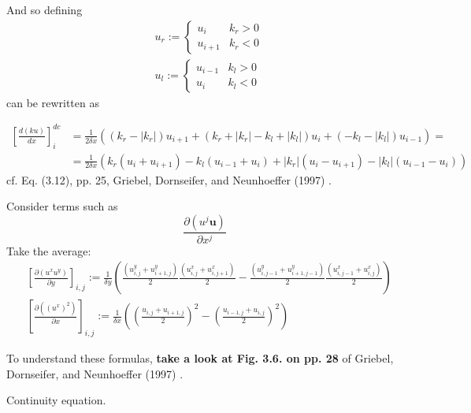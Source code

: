\documentclass[10pt]{amsart}
\begin{document}
\begin{multicols*}{2}
And so defining
\begin{equation}
  \begin{aligned}
    & u_r := \begin{cases} u_i & k_r > 0 \\ u_{i+1} & k_r < 0 \end{cases} \\
    & u_l := \begin{cases} u_{i-1} & k_l > 0 \\ u_i & k_l < 0 \end{cases}
    \end{aligned}
  \end{equation}
can be rewritten as

\begin{equation}\label{Eq:donorcellmethod}
  \begin{aligned}
    \left[ \frac{d(ku) }{dx} \right]_i^{dc} & = \frac{1}{2\delta x} ((k_r - |k_r| ) u_{i+1}  + (k_r + |k_r|  - k_l + |k_l| )u_i + (-k_l - |k_l| ) u_{i-1})  = \\
    &= \frac{1}{2\delta x} (k_r (u_i + u_{i+1} ) - k_l (u_{i-1} + u_i ) + |k_r| (u_i - u_{i+1}) - |k_l|(u_{i-1} - u_i ) )
    \end{aligned}
  \end{equation}
cf. Eq. (3.12), pp. 25, Griebel, Dornseifer, and Neunhoeffer (1997) \cite{GDN1997}.

Consider terms such as
\[
\frac{ \partial (u^j \mathbf{u} )}{ \partial x^j}
\]
Take the average:
\begin{equation}
\begin{aligned}
  & \left[ \frac{ \partial (u^x u^y ) }{ \partial y} \right]_{i,j} := \frac{1}{ \delta y } \left( \frac{ (u^y_{i,j} + u^y_{i+1,j} )}{2} \frac{ (u^x_{i,j} + u^x_{i,j+1} )}{2} - \frac{ (u^y_{i,j-1} + u^y_{i+1,j-1} )}{2} \frac{ (u^x_{i,j-1} + u^x_{i,j} )}{2} \right) \\ 
  & \left[ \frac{ \partial ((u^x)^2) }{ \partial x} \right]_{i,j} := \frac{1}{ \delta x} \left( \left( \frac{ u_{i,j}  + u_{i+1,j} }{2} \right)^2 - \left(  \frac{ u_{i-1,j}  + u_{i,j} }{2} \right)^2 \right)
  \end{aligned}
  \end{equation}

To understand these formulas, \textbf{take a look at Fig. 3.6. on pp. 28} of Griebel, Dornseifer, and Neunhoeffer (1997) \cite{GDN1997}. 



Continuity equation.


\end{multicols*}
\end{document}

